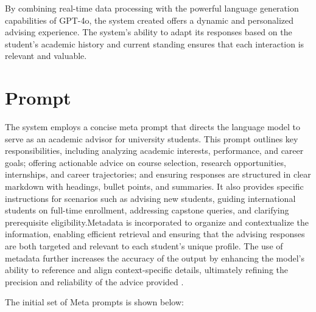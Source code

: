 \documentclass[12pt,oneside,openany]{report}
\begin{document}
By combining real-time data processing with the powerful language generation capabilities of GPT-4o, the system created  offers a dynamic and personalized advising experience. The system’s ability to adapt its responses based on the student’s academic history and current standing ensures that each interaction is relevant and valuable.

\section{Prompt}

The system employs a concise meta prompt that directs the language model to serve as an academic advisor for university students. This prompt outlines key responsibilities, including analyzing academic interests, performance, and career goals; offering actionable advice on course selection, research opportunities, internships, and career trajectories; and ensuring responses are structured in clear markdown with headings, bullet points, and summaries. It also provides specific instructions for scenarios such as advising new students, guiding international students on full-time enrollment, addressing capstone queries, and clarifying prerequisite eligibility.Metadata is incorporated to organize and contextualize the information, enabling efficient retrieval and ensuring that the advising responses are both targeted and relevant to each student's unique profile. The use of metadata further increases the accuracy of the output by enhancing the model's ability to reference and align context-specific details, ultimately refining the precision and reliability of the advice provided \cite{ha2023meta}.

 The initial set of Meta prompts is shown below:
\end{document}
